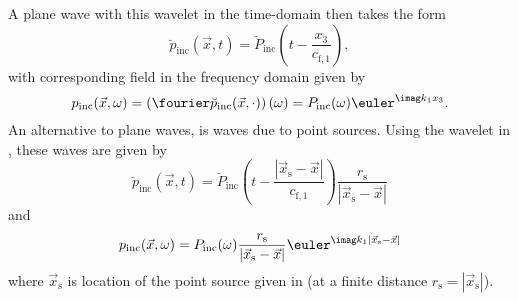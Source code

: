 A plane wave with this wavelet in the time-domain then takes the form
\begin{equation}\label{Eq1:PlaneWaveTimeDomain}
	\breve{p}_{\mathrm{inc}}(\vec{x},t) = \breve{P}_{\mathrm{inc}}\left(t-\frac{x_3}{c_{\mathrm{f},1}}\right),
\end{equation}
with corresponding field in the frequency domain given by
\begin{equation}
	p_{\mathrm{inc}}(\vec{x},\omega)=\left(\fourier\breve{p}_{\mathrm{inc}}(\vec{x},\cdot)\right)(\omega) = P_{\mathrm{inc}}(\omega)\euler^{\imag k_1 x_3}.
\end{equation}
An alternative to plane waves, is waves due to point sources. Using the wavelet in , these waves are given by
\begin{equation}
	\breve{p}_{\mathrm{inc}}(\vec{x},t) = \breve{P}_{\mathrm{inc}}\left(t-\frac{|\vec{x}_{\mathrm{s}}-\vec{x}|}{c_{\mathrm{f},1}}\right)\frac{r_{\mathrm{s}}}{|\vec{x}_{\mathrm{s}}-\vec{x}|}\label{Eq1:P_incOmega}
\end{equation}
and
\begin{equation*}
	p_{\mathrm{inc}}(\vec{x},\omega) = P_{\mathrm{inc}}(\omega)\frac{r_{\mathrm{s}}}{|\vec{x}_{\mathrm{s}}-\vec{x}|}\euler^{\imag k_1 |\vec{x}_{\mathrm{s}}-\vec{x}|}
\end{equation*}
where $\vec{x}_{\mathrm{s}}$ is location of the point source given in  (at a finite distance $r_{\mathrm{s}}=|\vec{x}_{\mathrm{s}}|$). 

